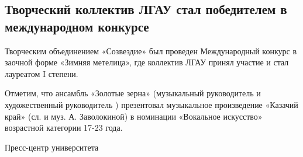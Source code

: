  
 
 
 
 
\subsection{Творческий коллектив ЛГАУ стал победителем в международном конкурсе}
\label{sec:01_12_2021.stz.edu.lnr.lgau.2.pobeda_konkurs_cheljabinsk}




Творческим объединением «Созвездие» был проведен Международный конкурс в
заочной форме «Зимняя метелица», где коллектив ЛГАУ принял участие и стал
лауреатом I степени.


Отметим, что ансамбль «Золотые зерна» (музыкальный руководитель  и
художественный руководитель ) презентовал музыкальное
произведение «Казачий край» (сл. и муз. А. Заволокиной) в номинации «Вокальное
искусство» возрастной категории 17-23 года.


Пресс-центр университета
